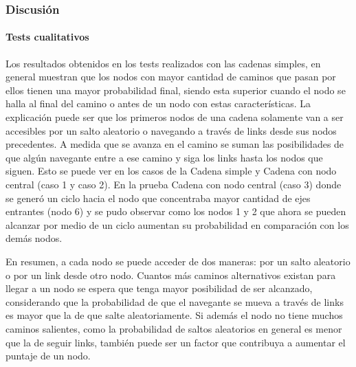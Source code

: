 \subsubsection*{Discusión}

\paragraph{Tests cualitativos}
Los resultados obtenidos en los tests realizados con las cadenas simples, en general muestran que los nodos con mayor cantidad de caminos que pasan por ellos tienen una mayor probabilidad final, siendo esta superior cuando el nodo se halla al final del camino o antes de un nodo con estas características. La explicación puede ser que los primeros nodos de una cadena solamente van a ser accesibles por un salto aleatorio o navegando a través de links desde sus nodos precedentes. A medida que se avanza en el camino se suman las posibilidades de que algún navegante entre a ese camino y siga los links hasta los nodos que siguen. Esto se puede ver en los casos de la Cadena simple y Cadena con nodo central (caso 1 y caso 2). En la prueba Cadena con nodo central (caso 3) donde se generó un ciclo hacia el nodo que concentraba mayor cantidad de ejes entrantes (nodo 6) y se pudo observar como los nodos 1 y 2 que ahora se pueden alcanzar por medio de un ciclo aumentan su probabilidad en comparación con los demás nodos.


En resumen, a cada nodo se puede acceder de dos maneras: por un salto aleatorio o por un link desde otro nodo. Cuantos más caminos alternativos existan para llegar a un nodo se espera que tenga mayor posibilidad de ser alcanzado, considerando que la probabilidad de que el navegante se mueva a través de links es mayor que la de que salte aleatoriamente. Si además el nodo no tiene muchos caminos salientes, como la probabilidad de saltos aleatorios en general es menor que la de seguir links, también puede ser un factor que contribuya a aumentar el puntaje de un nodo.
